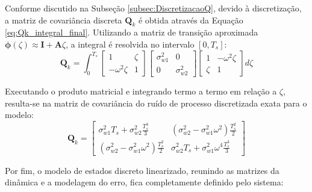 \documentclass[a4paper,12pt]{article}
\begin{document}
Conforme discutido na Subseção \ref{subsec:DiscretizacaoQ}, devido à discretização, a matriz de covariância discreta $\mathbf{Q}_k$ é obtida através da Equação \eqref{eq:Qk_integral_final}. Utilizando a matriz de transição aproximada $\mathbf{\phi}(\zeta) \approx \mathbf{I} + \mathbf{A}\zeta$, a integral é resolvida no intervalo $[0, T_s]$:
\begin{equation}
    \mathbf{Q}_k = \int_{0}^{T_s} \begin{bmatrix} 1 & \zeta \\ -\omega^2 \zeta & 1 \end{bmatrix} \begin{bmatrix} \sigma_{w1}^2 & 0 \\ 0 & \sigma_{w2}^2 \end{bmatrix} \begin{bmatrix} 1 & -\omega^2 \zeta \\ \zeta & 1 \end{bmatrix} d\zeta
\end{equation}

Executando o produto matricial e integrando termo a termo em relação a $\zeta$, resulta-se na matriz de covariância do ruído de processo discretizada exata para o modelo:
\begin{equation}
    \mathbf{Q}_k = \begin{bmatrix} 
        \sigma_{w1}^2 T_s + \sigma_{w2}^2 \frac{T_s^3}{3} & (\sigma_{w2}^2 - \sigma_{w1}^2 \omega^2) \frac{T_s^2}{2} \\ 
        (\sigma_{w2}^2 - \sigma_{w1}^2 \omega^2) \frac{T_s^2}{2} & \sigma_{w2}^2 T_s + \sigma_{w1}^2 \omega^4 \frac{T_s^3}{3} 
    \end{bmatrix}
    \label{eq:mod1_Qk_final}
\end{equation}

Por fim, o modelo de estados discreto linearizado, reunindo as matrizes da dinâmica e a modelagem do erro, fica completamente definido pelo sistema:
\end{document}
